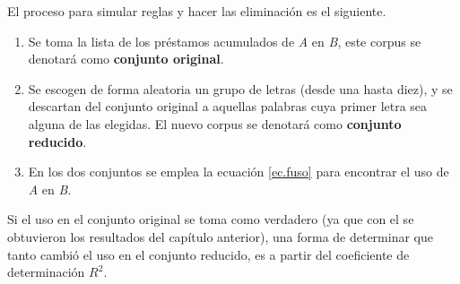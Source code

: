 El proceso para simular reglas y hacer las eliminación es el siguiente. 

\begin{enumerate}
	
	\item Se toma la lista de los préstamos acumulados de \textit{A} en \textit{B},  este corpus se denotará como \textbf{conjunto original}.
	
	\item Se escogen de forma aleatoria un grupo de letras (desde una hasta diez), y se descartan del conjunto original a aquellas  palabras cuya primer letra sea alguna de las elegidas. El nuevo corpus se denotará como \textbf{conjunto reducido}.
	
	
	\item En los dos conjuntos se emplea la ecuación \ref{ec.fuso} para encontrar el uso de \textit{A} en \textit{B}.
	
	
\end{enumerate}



Si el uso en el conjunto original se toma como verdadero (ya que con el se obtuvieron los resultados del capítulo anterior), una forma de determinar que tanto cambió el uso en el conjunto reducido, es a partir del coeficiente de determinación $R^{2}$. 

